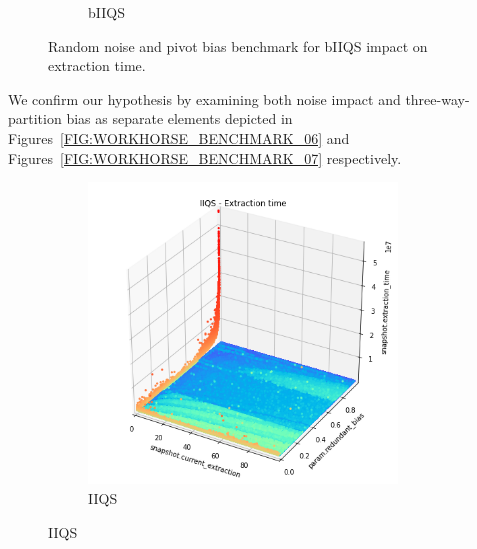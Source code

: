 \begin{figure}
\begin{subfigure}[b]{0.45\textwidth}
        \caption{bIIQS}
        \label{FIG:WORKHORSE_BENCHMARK_05__0_1}
    \end{subfigure}

    \caption{Random noise and pivot bias benchmark for bIIQS impact on extraction time.}
    \label{FIG:WORKHORSE_BENCHMARK_05}
\end{figure}

We confirm our hypothesis by examining both noise impact and three-way-partition bias as separate elements depicted in Figures~\ref{FIG:WORKHORSE_BENCHMARK_06} and Figures~\ref{FIG:WORKHORSE_BENCHMARK_07} respectively.\\


\begin{figure}
    \centering
    \begin{subfigure}[b]{0.45\textwidth}
        \centering
        \includegraphics[width=0.9\textwidth]{./fragments/05_workhorse_experiment/images/01_basebenchmark_06_redundant_bias.png.1_0.png}
        \caption{IIQS}
        \label{FIG:WORKHORSE_BENCHMARK_06__0_0}

\end{subfigure}
\end{figure}
